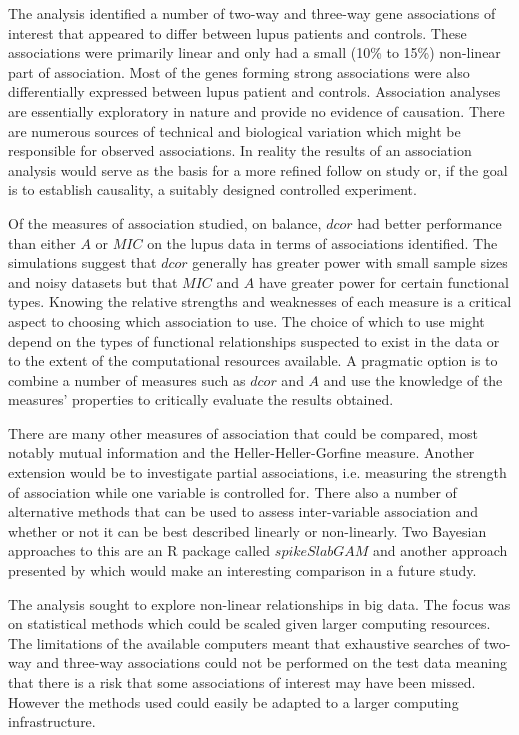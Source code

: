 \documentclass[a4paper, 12pt]{report}
\begin{document}
The analysis identified a number of two-way and three-way gene associations of interest that appeared to differ between lupus patients and controls. These associations were primarily linear and only had a small (10\% to 15\%) non-linear part of association. Most of the genes forming strong associations were also differentially expressed between lupus patient and controls. Association analyses are essentially exploratory in nature and provide no evidence of causation. There are numerous sources of technical and biological variation which might be responsible for observed associations. In reality the results of an association analysis would serve as the basis for a more refined follow on study or, if the goal is to establish causality, a suitably designed controlled experiment. 

Of the measures of association studied, on balance, $dcor$ had better performance than either $A$ or $MIC$ on the lupus data in terms of associations identified. The simulations suggest that $dcor$ generally has greater power with small sample sizes and noisy datasets but that $MIC$ and $A$ have greater power for certain functional types. Knowing the relative strengths and weaknesses of each measure is a critical aspect to choosing which association to use. The  choice of which to use might depend on the types of functional relationships suspected to exist in the data or to the extent of the computational resources available. A pragmatic option is to combine a number of measures such as $dcor$ and $A$ and use the knowledge of the measures' properties to critically evaluate the results obtained.

There are many other measures of association that could be compared, most notably mutual  information and the Heller-Heller-Gorfine \cite{HHG} measure. Another extension would be to investigate partial associations, i.e. measuring the strength of association while one variable is controlled for. There also a number of alternative methods that can be used to assess inter-variable association and whether or not it can be best described linearly or non-linearly. Two Bayesian approaches to this are an R package called $spikeSlabGAM$ \cite{spikeSlabGAM} and another approach presented by \citet{BayesianGRN} which would make an interesting comparison in a future study. 

The analysis sought to explore non-linear relationships in big data. The focus was on statistical methods which could be scaled given larger computing resources. The limitations of the available computers meant that exhaustive searches of two-way and three-way associations could not be performed on the test data meaning that there is a risk that some associations of interest may have been missed. However the methods used could easily be adapted to a larger computing infrastructure.
\end{document}
